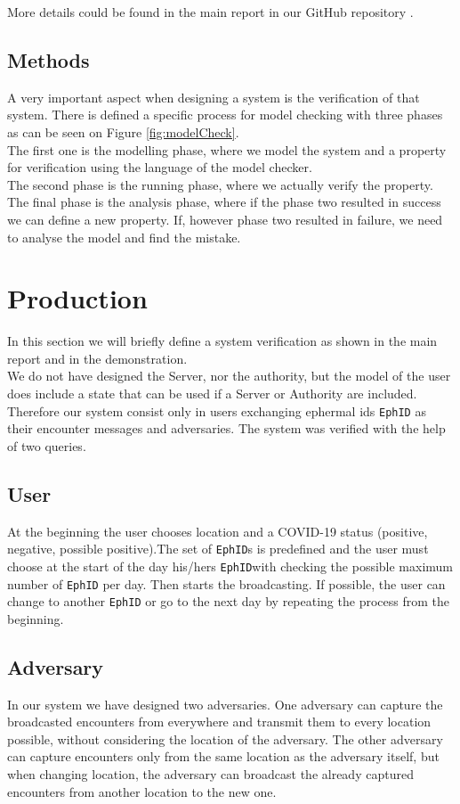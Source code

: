 \documentclass[a4paper, twocolumn]{article}
\begin{document}
\noindent More details could be found in the main report in our GitHub repository \cite{github}.
\subsection{Methods}
A very important aspect when designing a system is the verification of that system. There is defined a specific process for model checking with three phases as can be seen on Figure \ref{fig:modelCheck}.\\
The first one is the modelling phase, where we model the system and a property for verification using the language of the model checker.\\
The second phase is the running phase, where we actually verify the property.\\
The final phase is the analysis phase, where if the phase two resulted in success we can define a new property. If, however phase two resulted in failure, we need to analyse the model and find the mistake.

\section{Production}
In this section we will briefly define a system verification as shown in the main report and in the demonstration.\\
We do not have designed the Server, nor the authority, but the model of the user does include a state that can be used if a Server or Authority are included. Therefore our system consist only in users exchanging ephermal ids \texttt{EphID} as their encounter messages and adversaries. The system was verified with the help of two queries.
\subsection{User}
At the beginning the user chooses location and a COVID-19 status (positive, negative, possible positive).The set of \texttt{EphID}s is predefined and the user must choose at the start of the day his/hers \texttt{EphID}with checking the possible maximum number of \texttt{EphID} per day. Then starts the broadcasting. If possible, the user can change to another \texttt{EphID} or go to the next day by repeating the process from the beginning.

\subsection{Adversary}
In our system we have designed two adversaries. One adversary can capture the broadcasted encounters from everywhere and transmit them to every location possible, without considering the location of the adversary. The other adversary can capture encounters only from the same location as the adversary itself, but when changing location, the adversary can broadcast the already captured encounters from another location to the new one.
\end{document}
